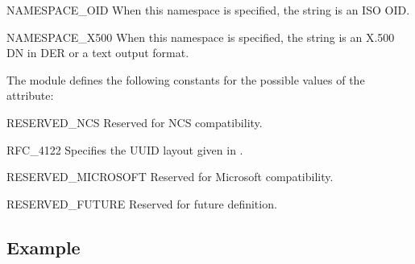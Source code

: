 \begin{datadesc}{NAMESPACE_OID}
When this namespace is specified,
the  string is an ISO OID.
\end{datadesc}

\begin{datadesc}{NAMESPACE_X500}
When this namespace is specified,
the  string is an X.500 DN in DER or a text output format.
\end{datadesc}

The  module defines the following constants
for the possible values of the  attribute:

\begin{datadesc}{RESERVED_NCS}
Reserved for NCS compatibility.
\end{datadesc}

\begin{datadesc}{RFC_4122}
Specifies the UUID layout given in .
\end{datadesc}

\begin{datadesc}{RESERVED_MICROSOFT}
Reserved for Microsoft compatibility.
\end{datadesc}

\begin{datadesc}{RESERVED_FUTURE}
Reserved for future definition.
\end{datadesc}


\begin{seealso}
\end{seealso}

\subsection{Example \label{uuid-example}}

